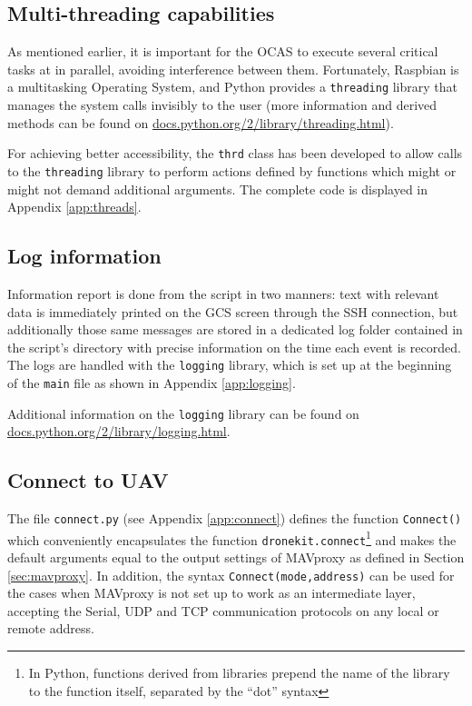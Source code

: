 \subsection{Multi-threading capabilities}

As mentioned earlier, it is important for the OCAS to execute several critical tasks at in parallel, avoiding interference between them.
Fortunately, Raspbian is a multitasking Operating System, and Python provides a \texttt{threading} library that manages the system calls invisibly to the user (more information and derived methods can be found on \url{docs.python.org/2/library/threading.html}).

For achieving better accessibility, the \texttt{thrd} class has been developed to allow calls to the \texttt{threading} library to perform actions defined by functions which might or might not demand additional arguments.
The complete code is displayed in Appendix \ref{app:threads}.

\subsection{Log information} \label{sec:logging}

Information report is done from the script in two manners:
text with relevant data is immediately printed on the GCS screen through the SSH connection, but additionally those same messages are stored in a dedicated log folder contained in the script's directory with precise information on the time each event is recorded.
The logs are handled with the \texttt{logging} library, which is set up at the beginning of the \texttt{main} file as shown in Appendix \ref{app:logging}.

Additional information on the \texttt{logging} library can be found on \url{docs.python.org/2/library/logging.html}.

\subsection{Connect to UAV} \label{sec:connect}

The file \texttt{connect.py} (see Appendix \ref{app:connect}) defines the function \texttt{Connect()} which conveniently encapsulates the function \texttt{dronekit.connect}\footnote{In Python, functions derived from libraries prepend the name of the library to the function itself, separated by the ``dot'' syntax} and makes the default arguments equal to the output settings of MAVproxy as defined in Section \ref{sec:mavproxy}.
In addition, the syntax \texttt{Connect(mode,address)} can be used for the cases when MAVproxy is not set up to work as an intermediate layer, accepting the Serial, UDP and TCP communication protocols on any local or remote address.

